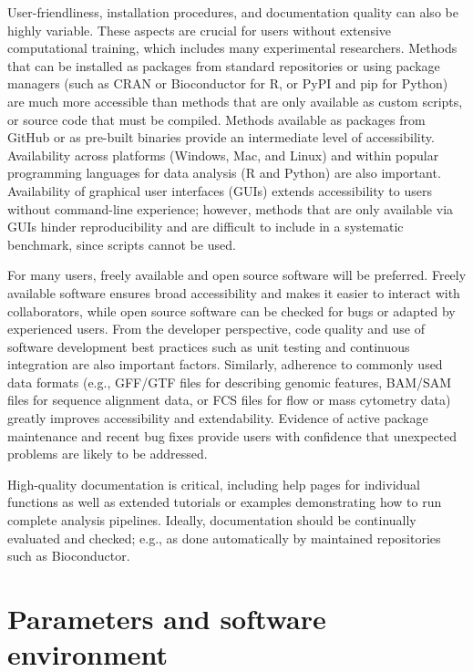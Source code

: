 \documentclass[12pt, a4paper]{article}
\begin{document}
User-friendliness, installation procedures, and documentation quality can also be highly variable. These aspects are crucial for users without extensive computational training, which includes many experimental researchers. Methods that can be installed as packages from standard repositories or using package managers (such as CRAN or Bioconductor for R, or PyPI and pip for Python) are much more accessible than methods that are only available as custom scripts, or source code that must be compiled. Methods available as packages from GitHub or as pre-built binaries provide an intermediate level of accessibility. Availability across platforms (Windows, Mac, and Linux) and within popular programming languages for data analysis (R and Python) are also important. Availability of graphical user interfaces (GUIs) extends accessibility to users without command-line experience; however, methods that are only available via GUIs hinder reproducibility and are difficult to include in a systematic benchmark, since scripts cannot be used.

For many users, freely available and open source software will be preferred. Freely available software ensures broad accessibility and makes it easier to interact with collaborators, while open source software can be checked for bugs or adapted by experienced users. From the developer perspective, code quality and use of software development best practices such as unit testing and continuous integration are also important factors. Similarly, adherence to commonly used data formats (e.g., GFF/GTF files for describing genomic features, BAM/SAM files for sequence alignment data, or FCS files for flow or mass cytometry data) greatly improves accessibility and extendability. Evidence of active package maintenance and recent bug fixes provide users with confidence that unexpected problems are likely to be addressed.

High-quality documentation is critical, including help pages for individual functions as well as extended tutorials or examples demonstrating how to run complete analysis pipelines. Ideally, documentation should be continually evaluated and checked; e.g., as done automatically by maintained repositories such as Bioconductor.




\section*{Parameters and software environment}
\end{document}
